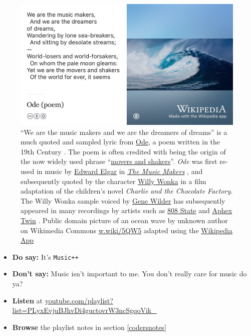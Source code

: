 \documentclass[
]{book}
\providecommand{\tightlist}{%
  \setlength{\itemsep}{0pt}\setlength{\parskip}{0pt}}
\begin{document}
\begin{figure}
\includegraphics[width=0.99\linewidth]{images/we-are-the-music-makers} \caption{``We are the music makers and we are the dreamers of dreams'' is a much quoted and sampled lyric from \href{https://en.wikipedia.org/wiki/Ode_(poem)}{Ode}, a poem written in the 19th Century \citep{ode}. The poem is often credited with being the origin of the now widely used phrase ``\href{https://en.wikipedia.org/wiki/Movers_and_Shakers}{movers and shakers}''. \emph{Ode} was first re-used in music by \href{https://en.wikipedia.org/wiki/Edward_Elgar}{Edward Elgar} in \emph{\href{https://en.wikipedia.org/wiki/The_Music_Makers_(Elgar)}{The Music Makers}} \citep{themusicmakers}, and subsequently quoted by the character \href{https://en.wikipedia.org/wiki/Willy_Wonka}{Willy Wonka} in a film adaptation \citep{wonka} of the children's novel \emph{Charlie and the Chocolate Factory}. \citep{dahl} The Willy Wonka sample voiced by \href{https://en.wikipedia.org/wiki/Gene_Wilder}{Gene Wilder} has subsequently appeared in many recordings by artists such as \href{https://en.wikipedia.org/wiki/808_State}{808 State} \citep{nephatiti} and \href{https://en.wikipedia.org/wiki/Aphex_Twin}{Aphex Twin} \citep{aphextwin}. Public domain picture of an ocean wave by unknown author on Wikimedia Commons \href{https://w.wiki/5QW5}{w.wiki/5QW5} adapted using the \href{https://apps.apple.com/gb/app/wikipedia/id324715238}{Wikipedia App}}\label{fig:music-makers-fig}
\end{figure}



\begin{itemize}
\tightlist
\item
  \textbf{Do say:} It's \texttt{Music++}
\item
  \textbf{Don't say:} Music isn't important to me. You don't really care for music do ya? \citep{hallelujah}
\item
  \textbf{Listen} at \href{https://youtube.com/playlist?list=PLyxEvjuBJhvDi4guctovrW3ncSgqoVik_}{youtube.com/playlist?list=PLyxEvjuBJhvDi4guctovrW3ncSgqoVik\_}
\item
  \textbf{Browse} the playlist notes in section \ref{codersnotes}
\end{itemize}
\end{document}
